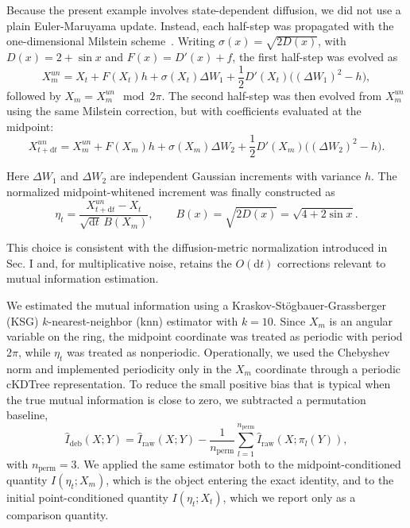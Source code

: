 \documentclass[
 longbibliography,
 twocolumn,
 superscriptaddress,
 amsmath,
 amssymb,
 amsthm,
 amsfonts,
 prl,
 floatfix,
]{revtex4-2}
\begin{document}
\begin{widetext}
Because the present example involves state-dependent diffusion, we did not use a plain Euler-Maruyama update. Instead, each half-step was propagated with the one-dimensional Milstein scheme~\cite{milstein1975strong,kloeden1992numerical}. Writing $\sigma(x)=\sqrt{2D(x)}$, with $D(x)=2+\sin x$ and $F(x)=D'(x)+f$, the first half-step was evolved as
\[
    X_m^{un}=X_t+F(X_t)h+\sigma(X_t)\Delta W_1
    +\frac{1}{2}D'(X_t)\big((\Delta W_1)^2-h\big),
\]
followed by $X_m=X_m^{un}\mod{2\pi}$. The second half-step was then evolved from $X_m^{un}$ using the same Milstein correction, but with coefficients evaluated at the midpoint:
\[
    X_{t+\mathrm dt}^{un}=X_m^{un}+F(X_m)h+\sigma(X_m)\Delta W_2
    +\frac{1}{2}D'(X_m)\big((\Delta W_2)^2-h\big).
\]

Here $\Delta W_1$ and $\Delta W_2$ are independent Gaussian increments with variance $h$. The normalized midpoint-whitened increment was finally constructed as
\[
    \eta_t=\frac{X_{t+\mathrm dt}^{un}-X_t}{\sqrt{\mathrm dt}\,B(X_m)},
    \qquad B(x)=\sqrt{2D(x)}=\sqrt{4+2\sin x}.
\]

This choice is consistent with the diffusion-metric normalization introduced in Sec. I and, for multiplicative noise, retains the $O(\mathrm dt)$ corrections relevant to mutual information estimation.

We estimated the mutual information using a Kraskov-Stögbauer-Grassberger (KSG) $k$-nearest-neighbor (knn) estimator with $k=10$. Since $X_m$ is an angular variable on the ring, the midpoint coordinate was treated as periodic with period $2\pi$, while $\eta_t$ was treated as nonperiodic. Operationally, we used the Chebyshev norm and implemented periodicity only in the $X_m$ coordinate through a periodic cKDTree representation. To reduce the small positive bias that is typical when the true mutual information is close to zero, we subtracted a permutation baseline,
\[
    \hat I_{\mathrm{deb}}(X;Y)=\hat I_{\mathrm{raw}}(X;Y)
    -\frac{1}{n_{\mathrm{perm}}}\sum_{l=1}^{n_{\mathrm{perm}}}
    \hat I_{\mathrm{raw}}(X;\pi_l (Y)),
\]
with $n_{\mathrm{perm}}=3$. We applied the same estimator both to the midpoint-conditioned quantity $I(\eta_t;X_m)$, which is the object entering the exact identity, and to the initial point-conditioned quantity $I(\eta_t;X_t)$, which we report only as a comparison quantity.


\end{widetext}
\end{document}
